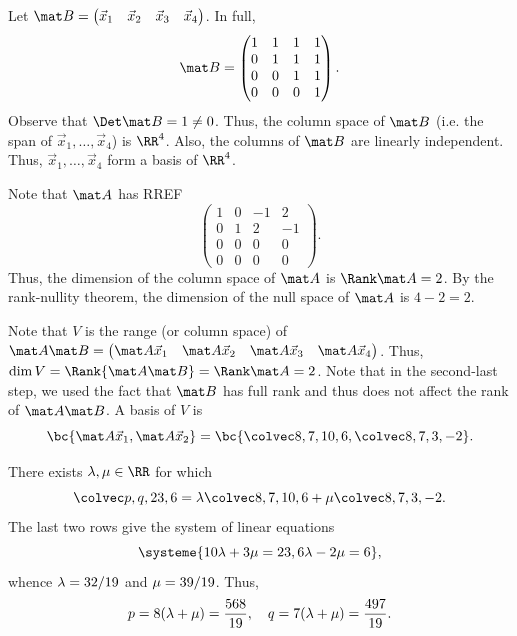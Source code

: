 \begin{solution}
    \begin{ppart}
        Let $\mat B = \begin{pmatrix}\vec x_1 & \vec x_2 & \vec x_3 & \vec x_4\end{pmatrix}$. In full, \[\mat B = \begin{pmatrix}1 & 1 & 1 & 1 \\ 0 & 1 & 1 & 1 \\ 0 & 0 & 1 & 1 \\ 0 & 0 & 0 & 1\end{pmatrix}.\] Observe that $\Det \mat B = 1 \neq 0$. Thus, the column space of $\mat B$ (i.e. the span of $\vec x_1, \dots, \vec x_4$) is $\RR^4$. Also, the columns of $\mat B$ are linearly independent. Thus, $\vec x_1, \dots, \vec x_4$ form a basis of $\RR^4$.
    \end{ppart}
    \begin{ppart}
        Note that $\mat A$ has RREF \[\begin{pmatrix}1 & 0 & -1 & 2 \\ 0 & 1 & 2 & -1 \\ 0 & 0 & 0 & 0 \\ 0 & 0 & 0 & 0\end{pmatrix}.\] Thus, the dimension of the column space of $\mat A$ is $\Rank \mat A = 2$. By the rank-nullity theorem, the dimension of the null space of $\mat A$ is $4- 2 = 2$.
    \end{ppart}
    \begin{ppart}
        Note that $V$ is the range (or column space) of $\mat A \mat B = \begin{pmatrix}\mat A \vec x_1 & \mat A \vec x_2 & \mat A \vec x_3 & \mat A \vec x_4 \end{pmatrix}$. Thus, $\dim V = \Rank{\mat A \mat B} = \Rank \mat A = 2$. Note that in the second-last step, we used the fact that $\mat B$ has full rank and thus does not affect the rank of $\mat A \mat B$. A basis of $V$ is \[\bc{\mat A \vec x_1, \mat A \vec x_2} = \bc{\cveciv87{10}6, \cveciv873{-2}}.\]
    \end{ppart}
    \begin{ppart}
        There exists $\l, \m \in \RR$ for which \[\cveciv{p}{q}{23}{6} = \l \cveciv87{10}6 + \m \cveciv873{-2}.\] The last two rows give the system of linear equations \[\systeme{10\l + 3\m = 23, 6\l - 2\m = 6},\] whence $\lambda = 32/19$ and $\mu = 39/19$. Thus, \[p = 8(\lambda + \mu) = \frac{568}{19}, \quad q = 7(\lambda + \mu) = \frac{497}{19}.\]
    \end{ppart}
\end{solution}